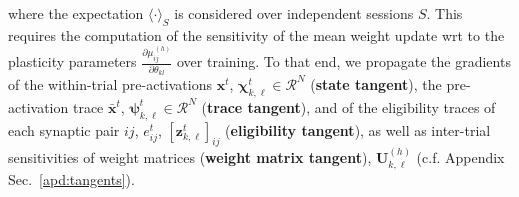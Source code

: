 \documentclass[mlabstract]{jmlr}
\begin{document}
where the expectation $\langle \cdot \rangle_S$ is considered over independent sessions $S$. This requires the computation of the sensitivity of the mean weight update wrt to the plasticity parameters $ \frac{\partial \mu^{\,(h)}_{ij}}{\partial \theta_{kl}}$ over training. To that end, we propagate the gradients of the within-trial pre-activations $\mathbf{x}^t$, $\boldsymbol{\chi}_{k,\ell}^t \in \mathcal{R}^N$ (\textbf{state tangent}), the pre-activation trace $\bar{\mathbf{x}}^t$, $\boldsymbol{\psi}_{k,\ell}^t \in \mathcal{R}^N$ (\textbf{trace tangent}), and of the eligibility traces of each synaptic pair $ij$, $e^t_{ij}$, ${[\mathbf{z}^t_{k,\ell}]}_{ij}$ (\textbf{eligibility tangent}), as well as inter-trial sensitivities of weight matrices (\textbf{weight matrix tangent}), $\mathbf{U}_{k,\ell}^{(h)}$ (c.f. Appendix Sec.~\ref{apd:tangents}).


\newpage









\appendix
\end{document}
